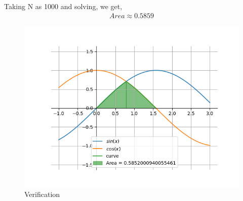 \documentclass[journal]{IEEEtran}
\begin{document}
    Taking N as 1000 and solving, we get,
    \begin{align}
        Area \approx 0.5859
    \end{align}

    \begin{figure}[ht]  
        \centering  
        \includegraphics[width=\columnwidth]{figs/fig1.png}  
        \caption{Verification}
    \end{figure}
\end{document}
